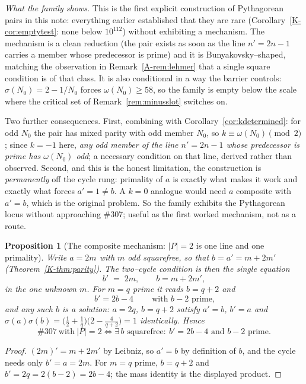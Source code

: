 \documentclass[11pt]{article}
\newtheorem{proposition}[theorem]{Proposition}
\theoremstyle{definition}
\begin{document}
\emph{What the family shows.} This is the first explicit construction of Pythagorean pairs in this note: everything earlier
established that they are rare \textup{(}Corollary~\ref{K-cor:emptytest}: none below $10^{112}$\textup{)}
without exhibiting a mechanism. The mechanism is a clean reduction (the pair exists as soon as the
line $n'=2n-1$ carries a member whose predecessor is prime) and it is Bunyakovsky--shaped, matching
the observation in Remark~\ref{A-rem:lehmer} that a single square condition is of that class. It is also
conditional in a way the barrier controls: $\sigma(N_0)=2-1/N_0$ forces $\omega(N_0)\ge58$, so the
family is empty below the scale where the critical set of Remark~\ref{rem:minusslot} switches on.

Two further consequences. First, combining with Corollary~\ref{cor:kdetermined}: for odd $N_0$ the
pair has mixed parity with odd member $N_0$, so $k\equiv\omega(N_0)\pmod2$; since $k=-1$ here,
\emph{any odd member of the line $n'=2n-1$ whose predecessor is prime has $\omega(N_0)$ odd}; a
necessary condition on that line, derived rather than observed. Second, and this is the honest
limitation, the construction is \emph{permanently} off the cycle rung: primality of $a$ is exactly
what makes it work and exactly what forces $a'=1\ne b$. A $k=0$ analogue would need $a$ composite with
$a'=b$, which is the original problem. So the family exhibits the Pythagorean locus without
approaching \#307; useful as the first worked mechanism, not as a route.


\begin{proposition}[The composite mechanism: $|P|=2$ is one line and one primality]\label{prop:compositea}
Write $a=2m$ with $m$ odd squarefree, so that $b=a'=m+2m'$ \textup{(}Theorem~\ref{K-thm:parity}\textup{)}.
The two--cycle condition is then the single equation
\[ b'\;=\;2m,\qquad b=m+2m', \]
in the one unknown $m$. For $m=q$ prime it reads $b=q+2$ and
\[ \boxed{\ b'=2b-4\ }\qquad\text{with } b-2 \text{ prime}, \]
and any such $b$ \emph{is} a solution: $a=2q$, $b=q+2$ satisfy $a'=b$, $b'=a$ and
$\sigma(a)\sigma(b)=\bigl(\tfrac12+\tfrac1q\bigr)\bigl(2-\tfrac4{q+2}\bigr)=1$ identically. Hence
\[ \#307\ \text{with}\ |P|=2 \iff \exists\,b \text{ squarefree}:\ b'=2b-4 \text{ and } b-2 \text{ prime}. \]
\end{proposition}
\begin{proof}
$(2m)'=m+2m'$ by Leibniz, so $a'=b$ by definition of $b$, and the cycle needs only $b'=a=2m$. For
$m=q$ prime, $b=q+2$ and $b'=2q=2(b-2)=2b-4$; the mass identity is the displayed product.
\end{proof}
\end{document}
